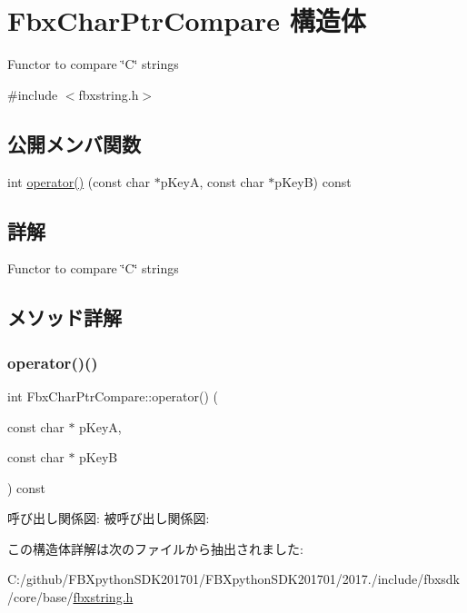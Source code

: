 \hypertarget{struct_fbx_char_ptr_compare}{}\section{Fbx\+Char\+Ptr\+Compare 構造体}
\label{struct_fbx_char_ptr_compare}


Functor to compare \char`\"{}\+C\char`\"{} strings  




{\ttfamily \#include $<$fbxstring.\+h$>$}

\subsection*{公開メンバ関数}
\begin{DoxyCompactItemize}
\item 
int \hyperlink{struct_fbx_char_ptr_compare_a5806b2dabf3997394fe7db69526e876d}{operator()} (const char $\ast$p\+KeyA, const char $\ast$p\+KeyB) const
\end{DoxyCompactItemize}


\subsection{詳解}
Functor to compare \char`\"{}\+C\char`\"{} strings 

\subsection{メソッド詳解}
\mbox{\label{struct_fbx_char_ptr_compare_a5806b2dabf3997394fe7db69526e876d}} 
\subsubsection{\texorpdfstring{operator()()}{operator()()}}
{\footnotesize\ttfamily int Fbx\+Char\+Ptr\+Compare\+::operator() (\begin{DoxyParamCaption}\item[{const char $\ast$}]{p\+KeyA,  }\item[{const char $\ast$}]{p\+KeyB }\end{DoxyParamCaption}) const}

呼び出し関係図\+:
被呼び出し関係図\+:


この構造体詳解は次のファイルから抽出されました\+:\begin{DoxyCompactItemize}
\item 
C\+:/github/\+F\+B\+Xpython\+S\+D\+K201701/\+F\+B\+Xpython\+S\+D\+K201701/2017./include/fbxsdk/core/base/\hyperlink{fbxstring_8h}{fbxstring.\+h}\end{DoxyCompactItemize}
